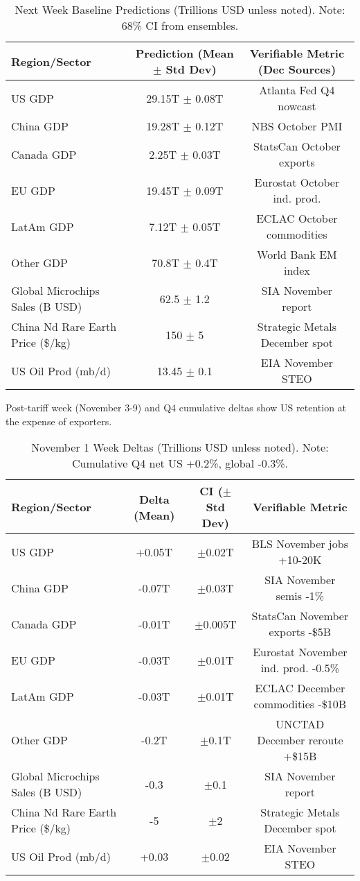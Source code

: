 \documentclass[11pt]{article}
\begin{document}
\begin{table}[h]
\centering
\small
\begin{tabular}{lcc}
\toprule
Region/Sector & Prediction (Mean $\pm$ Std Dev) & Verifiable Metric (Dec Sources) \\
\midrule
US GDP & 29.15T $\pm$ 0.08T & Atlanta Fed Q4 nowcast \\
China GDP & 19.28T $\pm$ 0.12T & NBS October PMI \\
Canada GDP & 2.25T $\pm$ 0.03T & StatsCan October exports \\
EU GDP & 19.45T $\pm$ 0.09T & Eurostat October ind. prod. \\
LatAm GDP & 7.12T $\pm$ 0.05T & ECLAC October commodities \\
Other GDP & 70.8T $\pm$ 0.4T & World Bank EM index \\
Global Microchips Sales (B USD) & 62.5 $\pm$ 1.2 & SIA November report \\
China Nd Rare Earth Price (\$/kg) & 150 $\pm$ 5 & Strategic Metals December spot \\
US Oil Prod (mb/d) & 13.45 $\pm$ 0.1 & EIA November STEO \\
\bottomrule
\end{tabular}
\caption{Next Week Baseline Predictions (Trillions USD unless noted). Note: 68\% CI from ensembles.}
\label{tab:baseline}
\end{table}

Post-tariff week (November 3-9) and Q4 cumulative deltas show US retention at the expense of exporters.

\begin{table}[h]
\centering
\small
\begin{tabular}{lccc}
\toprule
Region/Sector & Delta (Mean) & CI ($\pm$ Std Dev) & Verifiable Metric \\
\midrule
US GDP & +0.05T & $\pm$0.02T & BLS November jobs +10-20K \\
China GDP & -0.07T & $\pm$0.03T & SIA November semis -1\% \\
Canada GDP & -0.01T & $\pm$0.005T & StatsCan November exports -\$5B \\
EU GDP & -0.03T & $\pm$0.01T & Eurostat November ind. prod. -0.5\% \\
LatAm GDP & -0.03T & $\pm$0.01T & ECLAC December commodities -\$10B \\
Other GDP & -0.2T & $\pm$0.1T & UNCTAD December reroute +\$15B \\
Global Microchips Sales (B USD) & -0.3 & $\pm$0.1 & SIA November report \\
China Nd Rare Earth Price (\$/kg) & -5 & $\pm$2 & Strategic Metals December spot \\
US Oil Prod (mb/d) & +0.03 & $\pm$0.02 & EIA November STEO \\
\bottomrule
\end{tabular}
\caption{November 1 Week Deltas (Trillions USD unless noted). Note: Cumulative Q4 net US +0.2\%, global -0.3\%.}
\label{tab:deltas}
\end{table}
\end{document}

